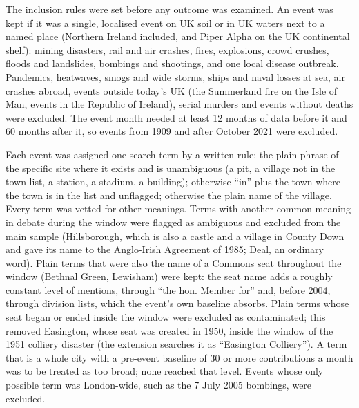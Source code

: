 \documentclass[11pt,a4paper]{article}
\begin{document}
The inclusion rules were set before any outcome was examined. An event was kept if it was a single, localised event on UK soil or in UK waters next to a named place (Northern Ireland included, and Piper Alpha on the UK continental shelf): mining disasters, rail and air crashes, fires, explosions, crowd crushes, floods and landslides, bombings and shootings, and one local disease outbreak. Pandemics, heatwaves, smogs and wide storms, ships and naval losses at sea, air crashes abroad, events outside today's UK (the Summerland fire on the Isle of Man, events in the Republic of Ireland), serial murders and events without deaths were excluded. The event month needed at least 12 months of data before it and 60 months after it, so events from 1909 and after October 2021 were excluded.

Each event was assigned one search term by a written rule: the plain phrase of the specific site where it exists and is unambiguous (a pit, a village not in the town list, a station, a stadium, a building); otherwise ``in'' plus the town where the town is in the list and unflagged; otherwise the plain name of the village. Every term was vetted for other meanings. Terms with another common meaning in debate during the window were flagged as ambiguous and excluded from the main sample (Hillsborough, which is also a castle and a village in County Down and gave its name to the Anglo-Irish Agreement of 1985; Deal, an ordinary word). Plain terms that were also the name of a Commons seat throughout the window (Bethnal Green, Lewisham) were kept: the seat name adds a roughly constant level of mentions, through ``the hon. Member for'' and, before 2004, through division lists, which the event's own baseline absorbs. Plain terms whose seat began or ended inside the window were excluded as contaminated; this removed Easington, whose seat was created in 1950, inside the window of the 1951 colliery disaster (the extension searches it as ``Easington Colliery''). A term that is a whole city with a pre-event baseline of 30 or more contributions a month was to be treated as too broad; none reached that level. Events whose only possible term was London-wide, such as the 7 July 2005 bombings, were excluded.
\end{document}
